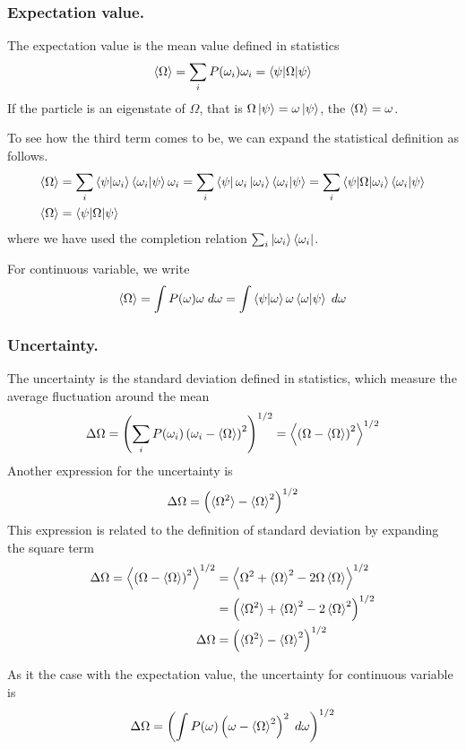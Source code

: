 \documentclass[../../../main.tex]{subfiles}
\begin{document}
\subsubsection{Expectation value.}
The expectation value is the mean value defined in statistics
\begin{equation*}
    \braket{\Omega}=\sum_i P(\omega_i)\omega_i=\braket{\psi|\Omega|\psi}
\end{equation*}
If the particle is an eigenstate of $\Omega$, that is $\Omega \ket{\psi}=\omega \ket{\psi}$, the $\braket{\Omega}=\omega$.

To see how the third term comes to be, we can expand the statistical definition as follows.
\begin{align*}
    \braket{\Omega } & = \sum_i \braket{\psi|\omega_i }\braket{\omega_i|\psi}\omega_i =\sum_i \bra{\psi}\omega_i \ket{\omega_i }\braket{\omega_i|\psi}=\sum_i \braket{\psi|\Omega|\omega_i}\braket{\omega_i|\psi} \\
    \braket{\Omega}  & = \braket{\psi|\Omega|\psi}
\end{align*}
where we have used the completion relation $\sum_i \ket{\omega_i}\bra{\omega_i }$.

For continuous variable, we write
\begin{equation*}
    \braket{\Omega}=\int P(\omega)\omega\;d \omega=\int \braket{\psi|\omega}\omega \braket{\omega|\psi}\; d\omega
\end{equation*}

\subsubsection{Uncertainty.}
The uncertainty is the standard deviation defined in statistics, which measure the average fluctuation around the mean
\begin{equation*}
    \Delta\Omega=\left(\sum_i P(\omega_i)\left( \omega_i -\braket{\Omega} \right)^2 \right)^{1/2}=\left\langle \left( \Omega-\braket{\Omega} \right)^2 \right\rangle  ^{1/2}
\end{equation*}
Another expression for the uncertainty is
\begin{equation*}
    \Delta\Omega=\left( \braket{\Omega^2}-\braket{\Omega}^2 \right) ^{1/2}
\end{equation*}
This expression is related to the definition of standard deviation by expanding the square term
\begin{align*}
    \Delta\Omega=\left\langle \left( \Omega-\braket{\Omega} \right)^2 \right\rangle  ^{1/2} &
    = \left\langle \Omega^2+\braket{\Omega}^2-2\Omega \braket{\Omega } \right\rangle^{1/2}    \\
                                                                                            &
    = \left( \braket{\Omega^2}+\braket{\Omega}^2-2 \braket{\Omega}^2 \right) ^{1/2}           \\
    \Delta\Omega                                                                            &
    = \left( \braket{\Omega^2}-\braket{\Omega}^2 \right) ^{1/2}
\end{align*}

As it the case with the expectation value, the uncertainty for continuous variable is
\begin{equation*}
    \Delta\Omega=\left( \int P(\omega)\left( \omega-\braket{\Omega}^2 \right)^2  \;d \omega\right) ^{1/2}
\end{equation*}
\end{document}
